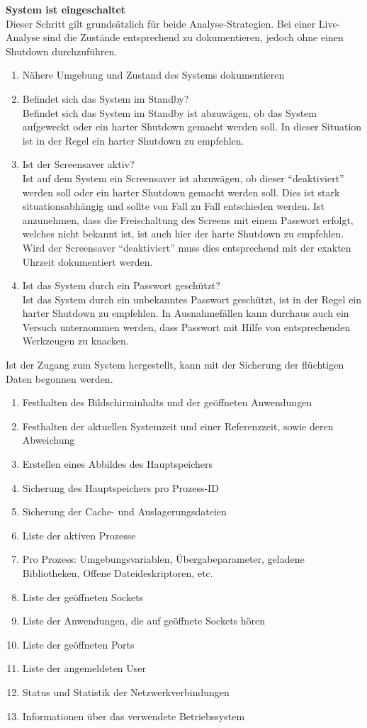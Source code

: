 \textbf{System ist eingeschaltet}\\
Dieser Schritt gilt grundsätzlich für beide Analyse-Strategien. Bei einer Live-Analyse sind die Zustände entsprechend zu dokumentieren, jedoch ohne einen Shutdown durchzuführen. 

\begin{enumerate}
\item Nähere Umgebung und Zustand des Systems dokumentieren
\item Befindet sich das System im Standby? \\
Befindet sich das System im Standby ist abzuwägen, ob das System aufgeweckt oder ein harter Shutdown gemacht werden soll. In dieser Situation ist in der Regel ein harter Shutdown  zu empfehlen.
\item Ist der Screensaver aktiv? \\
Ist auf dem System ein Screensaver ist abzuwägen, ob dieser "`deaktiviert"' werden soll oder ein harter Shutdown gemacht werden soll. Dies ist stark situationsabhängig und sollte von Fall zu Fall entschieden werden. Ist anzunehmen, dass die Freischaltung des Screens mit einem Passwort erfolgt, welches nicht bekannt ist, ist auch hier der harte Shutdown zu empfehlen. Wird der Screensaver "`deaktiviert"' muss dies entsprechend mit der exakten Uhrzeit dokumentiert werden.
\item Ist das System durch ein Passwort geschützt? \\
Ist das System durch ein unbekanntes Passwort geschützt, ist in der Regel ein harter Shutdown zu empfehlen. In Ausnahmefällen kann durchaus auch ein Versuch unternommen werden, dass Passwort mit Hilfe von entsprechenden Werkzeugen zu knacken.
\end{enumerate}

Ist der Zugang zum System hergestellt, kann mit der Sicherung der flüchtigen Daten begonnen werden. 

\begin{enumerate}
\item Festhalten des Bildschirminhalts und der geöffneten Anwendungen
\item Festhalten der aktuellen Systemzeit und einer Referenzzeit, sowie deren Abweichung
\item Erstellen eines Abbildes des Hauptspeichers
\item Sicherung des Hauptspeichers pro Prozess-ID
\item Sicherung der Cache- und Auslagerungsdateien
\item Liste der aktiven Prozesse
\item Pro Prozess: Umgebungsvariablen, Übergabeparameter, geladene Bibliotheken, Offene Dateideskriptoren, etc.
\item Liste der geöffneten Sockets
\item Liste der Anwendungen, die auf geöffnete Sockets hören
\item Liste der geöffneten Ports
\item Liste der angemeldeten User
\item Status und Statistik der Netzwerkverbindungen
\item Informationen über das verwendete Betriebssystem
\end{enumerate}


